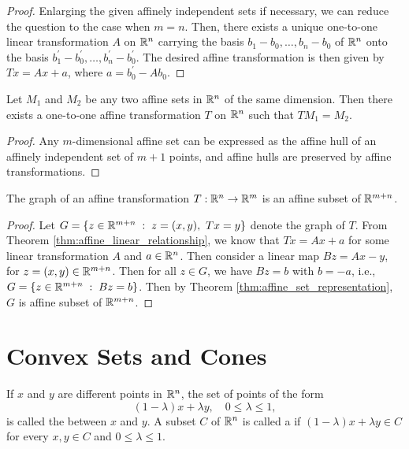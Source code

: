 \documentclass[11pt,a4paper]{article}
\begin{document}
\begin{proof}
    Enlarging the given affinely independent sets if necessary, we can reduce the question to the case when $m=n$. Then, there exists a unique one-to-one linear transformation $A$ on $\mathbb{R}^n$ carrying the basis $b_1-b_0,\ldots,b_n-b_0$ of $\mathbb{R}^n$ onto the basis $b_1^\prime-b_0^\prime,\ldots,b_n^\prime-b_0^\prime$. The desired affine transformation is then given by $Tx = Ax + a$, where $a = b_0^\prime - Ab_0$.
\end{proof}

\begin{corollary}
    Let $M_1$ and $M_2$ be any two affine sets in $\mathbb{R}^n$ of the same dimension. Then there exists a one-to-one affine transformation $T$ on $\mathbb{R}^n$ such that $TM_1 = M_2$.
\end{corollary}

\begin{proof}
    Any $m$-dimensional affine set can be expressed as the affine hull of an affinely independent set of $m+1$ points, and affine hulls are preserved by affine transformations.
\end{proof}

\begin{proposition}
    The graph of an affine transformation $T:\mathbb{R}^n\rightarrow \mathbb{R}^m$ is an affine subset of $\mathbb{R}^{m+n}$.
\end{proposition}

\begin{proof}
    Let $G = \{z\in\mathbb{R}^{m+n}\;:\; z = (x,y),\ Tx = y\}$ denote the graph of $T$. From Theorem \ref{thm:affine_linear_relationship}, we know that $Tx = Ax + a$ for some linear transformation $A$ and $a\in\mathbb{R}^n$. Then consider a linear map $Bz = Ax - y$, for $z = (x,y)\in\mathbb{R}^{m+n}$. Then for all $z\in G$, we have $Bz = b$ with $b = -a$, i.e., $G = \{z\in\mathbb{R}^{m+n}\;:\; Bz = b\}$. Then by Theorem \ref{thm:affine_set_representation}, $G$ is affine subset of $\mathbb{R}^{m+n}$. 
\end{proof}


\section{Convex Sets and Cones}

\begin{definition}
    If $x$ and $y$ are different points in $\mathbb{R}^n$, the set of points of the form 
    \begin{equation*}
        (1-\lambda)x + \lambda y, \quad 0\le \lambda\le 1,
    \end{equation*}
    is called the  between $x$ and $y$. A subset $C$ of $\mathbb{R}^n$ is called a  if $(1-\lambda)x + \lambda y\in C$ for every $x,y\in C$ and $0\le \lambda \le 1$.  
\end{definition}
\end{document}
